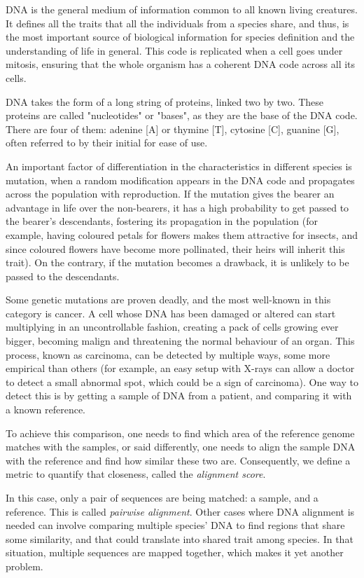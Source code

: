 
DNA is the general medium of information common to all known living creatures. It defines all the traits that all the individuals from a species share, and thus, is the most important source of biological information for species definition and the understanding of life in general. This code is replicated when a cell goes under mitosis, ensuring that the whole organism has a coherent DNA code across all its cells.

DNA takes the form of a long string of proteins, linked two by two. These proteins are called "nucleotides" or "bases", as they are the base of the DNA code. There are four of them: adenine [A] or thymine [T], cytosine [C], guanine [G], often referred to by their initial for ease of use.

An important factor of differentiation in the characteristics in different species is mutation, when a random modification appears in the DNA code and propagates across the population with reproduction. If the mutation gives the bearer an advantage in life over the non-bearers, it has a high probability to get passed to the bearer's descendants, fostering its propagation in the population (for example, having coloured petals for flowers makes them attractive for insects, and since coloured flowers have become more pollinated, their heirs will inherit this trait). On the contrary, if the mutation becomes a drawback, it is unlikely to be passed to the descendants.

Some genetic mutations are proven deadly, and the most well-known in this category is cancer. A cell whose DNA has been damaged or altered can start multiplying in an uncontrollable fashion, creating a pack of cells growing ever bigger, becoming malign and threatening the normal behaviour of an organ. This process, known as carcinoma, can be detected by multiple ways, some more empirical than others (for example, an easy setup with X-rays can allow a doctor to detect a small abnormal spot, which could be a sign of carcinoma). One way to detect this is by getting a sample of DNA from a patient, and comparing it with a known reference.

To achieve this comparison, one needs to find which area of the reference genome matches with the samples, or said differently, one needs to align the sample DNA with the reference and find how similar these two are. Consequently, we define a metric to quantify that closeness, called the \emph{alignment score}.

In this case, only a pair of sequences are being matched: a sample, and a reference. This is called \emph{pairwise alignment}. Other cases where DNA alignment is needed can involve comparing multiple species' DNA to find regions that share some similarity, and that could translate into shared trait among species. In that situation, multiple sequences are mapped together, which makes it yet another problem.